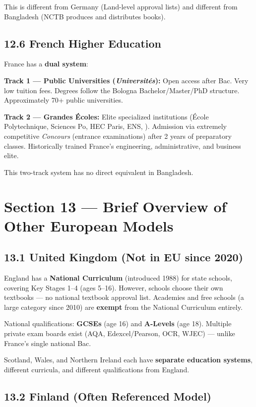 	This is different from Germany (Land-level approval lists) and different from Bangladesh (NCTB produces and distributes books).

	\subsection{12.6 French Higher Education}

	France has a \textbf{dual system}:

	\textbf{Track 1 --- Public Universities (\textit{Universités}):} Open access after Bac. Very low tuition fees. Degrees follow the Bologna Bachelor/Master/PhD structure. Approximately 70+ public universities.

	\textbf{Track 2 --- Grandes Écoles:} Elite specialized institutions (École Polytechnique, Sciences Po, HEC Paris, ENS, \etc). Admission via extremely competitive \textit{Concours} (entrance examinations) after 2 years of preparatory classes. Historically trained France's engineering, administrative, and business elite.

	This two-track system has no direct equivalent in Bangladesh.

	\section{Section 13 --- Brief Overview of Other European Models}

	\subsection{13.1 United Kingdom (Not in EU since 2020)}

	England has a \textbf{National Curriculum} (introduced 1988) for state schools, covering Key Stages 1--4 (ages 5--16). However, schools choose their own textbooks --- no national textbook approval list. Academies and free schools (a large category since 2010) are \textbf{exempt} from the National Curriculum entirely.

	National qualifications: \textbf{GCSEs} (age 16) and \textbf{A-Levels} (age 18). Multiple private exam boards exist (AQA, Edexcel/Pearson, OCR, WJEC) --- unlike France's single national Bac.

	Scotland, Wales, and Northern Ireland each have \textbf{separate education systems}, different curricula, and different qualifications from England.

	\subsection{13.2 Finland (Often Referenced Model)}

